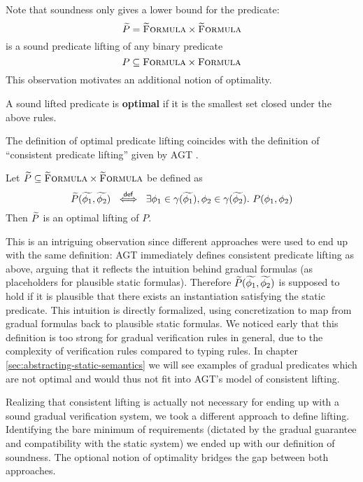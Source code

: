 Note that soundness only gives a lower bound for the predicate:
$$\widetilde{P} = \textup{\textsc{\ensuremath{\widetilde{\text{F}}}ormula}} \times \textup{\textsc{\ensuremath{\widetilde{\text{F}}}ormula}}$$ is a sound predicate lifting of any binary predicate $$P \subseteq \textup{\textsc{Formula}} \times \textup{\textsc{Formula}}$$
This observation motivates an additional notion of optimality.

\begin{definition}
    A sound lifted predicate is \textbf{optimal} if it is the smallest set closed under the above rules.
\end{definition}

The definition of optimal predicate lifting coincides with the definition of “consistent predicate lifting” given by AGT \cite{garcia2016abstracting}.
\begin{lemma}\label{lemma:consistent-pred-lifting-direct}
    Let $\widetilde{P} \subseteq \textup{\textsc{\ensuremath{\widetilde{\text{F}}}ormula}} \times \textup{\textsc{\ensuremath{\widetilde{\text{F}}}ormula}}$ be defined as
    \begin{displaymath} 
    \widetilde{P}(\widetilde{\phi_1}, \widetilde{\phi_2}) ~\overset{\textup{\textmd{\textsf{def}}}}{\iff}~ \exists \phi_1 \in \gamma(\widetilde{\phi_1}), \phi_2 \in \gamma(\widetilde{\phi_2}).~ P(\phi_1, \phi_2)
    \end{displaymath}
    Then $\widetilde{P}$ is an optimal lifting of $P$.
\end{lemma} %
This is an intriguing observation since different approaches were used to end up with the same definition:
AGT immediately defines consistent predicate lifting as above, arguing that it reflects the intuition behind gradual formulas (as placeholders for plausible static formulas).
Therefore $\widetilde{P}(\widetilde{\phi_1}, \widetilde{\phi_2})$ is supposed to hold if it is plausible that there exists an instantiation satisfying the static predicate.
This intuition is directly formalized, using concretization to map from gradual formulas back to plausible static formulas.
We noticed early that this definition is too strong for gradual verification rules in general, due to the complexity of verification rules compared to typing rules.
In chapter \ref{sec:abstracting-static-semantics} we will see examples of gradual predicates which are not optimal and would thus not fit into AGT's model of consistent lifting.

Realizing that consistent lifting is actually not necessary for ending up with a sound gradual verification system, we took a different approach to define lifting.
Identifying the bare minimum of requirements (dictated by the gradual guarantee and compatibility with the static system) we ended up with our definition of soundness.
The optional notion of optimality bridges the gap between both approaches.
